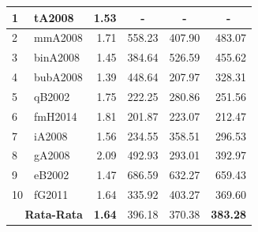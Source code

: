 \begin{table}[h!]
\begin{tabular}{llrrrr}
		1   & tA2008  & 1.53 & \multicolumn{1}{c}{-}   & \multicolumn{1}{c|}{-}   & \multicolumn{1}{c|}{-}    \\ \hline
		2   & mmA2008 & 1.71 & 558.23 & 407.90 & 483.07  \\ \hline
		3   & binA2008& 1.45 & 384.64 & 526.59 & 455.62  \\ \hline
		4   & bubA2008& 1.39 & 448.64 & 207.97 & 328.31  \\ \hline
		5   & qB2002  & 1.75 & 222.25 & 280.86 & 251.56  \\ \hline
		6  & fmH2014 & 1.81 & 201.87 & 223.07 & 212.47  \\ \hline
		7   & iA2008  & 1.56 & 234.55 & 358.51 & 296.53  \\ \hline
		8   & gA2008  & 2.09 & 492.93 & 293.01 & 392.97  \\ \hline
		9   & eB2002  & 1.47 & 686.59 & 632.27 & 659.43  \\ \hline
		10   & fG2011  & 1.64 & 335.92 & 403.27 & 369.60  \\ \hline
		\multicolumn{2}{r}{\textbf{Rata-Rata}}& \textbf{1.64} & 396.18 & 370.38 & \textbf{383.28}    \\ \hline\hline
	\end{tabular}
\end{table}